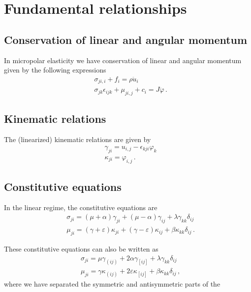 \documentclass[12pt]{article}
\begin{document}
\section{Fundamental relationships}
\subsection{Conservation of linear and angular momentum}
In micropolar elasticity we have conservation of linear and angular momentum given by the following expressions
\begin{subequations}\label{eq:conservation}
  \begin{align}
    &\sigma_{ji, i} + f_i = \rho \ddot{u}_i\\
    &\sigma_{jk} \epsilon_{ijk} + \mu_{ji, j} + c_i = J \ddot{\varphi}\, .
  \end{align}
\end{subequations}

\subsection{Kinematic relations}
The (linearized) kinematic relations are given by
\begin{subequations}\label{eq:kinematics}
  \begin{align}
    & \gamma_{ji} = u_{i,j} - \epsilon_{kji} \varphi_k\\
    & \kappa_{ji} = \varphi_{i,j}\, .
  \end{align}
\end{subequations}

\subsection{Constitutive equations}
In the linear regime, the constitutive equations are
\begin{subequations}\label{eq:constitutive}
  \begin{align}
    & \sigma_{ji} = (\mu + \alpha) \gamma_{ji} + (\mu - \alpha) \gamma_{ij} + \lambda \gamma_{kk} \delta_{ij}\\
    & \mu_{ji} = (\gamma + \varepsilon) \kappa_{ji} + (\gamma - \varepsilon) \kappa_{ij} + \beta \kappa_{kk} \delta_{ij}\, .
  \end{align}
\end{subequations}

These constitutive equations can also be written as
\begin{align*}
    & \sigma_{ji} = \mu \gamma_{(ij)} + 2 \alpha \gamma_{[ij]} + \lambda \gamma_{kk} \delta_{ij}\\
    & \mu_{ji} = \gamma \kappa_{(ij)} + 2\varepsilon \kappa_{[ij]} + \beta \kappa_{kk} \delta_{ij}\, ,
\end{align*}
where we have separated the symmetric and antisymmetric parts of the 
\end{document}

